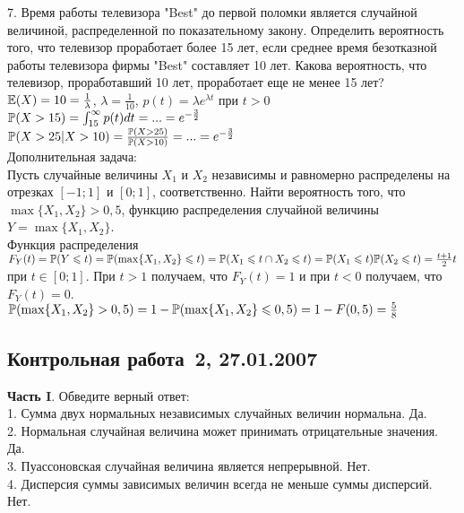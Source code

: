 \documentclass[pdftex,12pt,a4paper]{article}
\begin{document}
7.  Время работы телевизора "Best" до первой поломки является
случайной величиной, распределенной по показательному закону.
Определить вероятность того, что телевизор проработает более 15
лет, если среднее время безотказной работы телевизора фирмы "Best"
составляет 10 лет. Какова вероятность, что телевизор,
проработавший 10 лет, проработает еще не менее 15 лет? \\

$\E(X)=10=\frac{1}{\lambda}$, $\lambda=\frac{1}{10}$, $p(t)=\lambda
e^{\lambda t}$ при $t>0$ \\
$\P(X>15)=\int_{15}^{\infty}p(t)dt=...=e^{-\frac{3}{2}}$ \\
$\P(X>25|X>10)=\frac{\P(X>25)}{\P(X>10)}=...=e^{-\frac{3}{2}}$ \\

Дополнительная задача: \\
Пусть случайные величины $X_{1}$ и $X_{2}$ независимы и равномерно
распределены на отрезках $[-1;1]$ и $[0;1]$, соответственно. Найти
вероятность того, что $\max\{X_{1},X_{2}\}>0,5$, функцию
распределения случайной величины $Y=\max\{X_{1},X_{2}\}$. \\
Функция распределения $F_{Y}(t)=\P(Y\le t)=\P(\max\{X_{1},X_{2}\}\le
t)=\P(X_{1}\le t\cap X_{2}\le t)=\P(X_{1}\le t)\P(X_{2}\le
t)=\frac{t+1}{2}t$ при $t\in [0;1]$. При $t>1$ получаем, что
$F_{Y}(t)=1$ и при $t<0$ получаем, что $F_{Y}(t)=0$. \\
$\P(\max\{X_{1},X_{2}\}>0,5)=1-\P(\max\{X_{1},X_{2}\}\le
0,5)=1-F(0,5)=\frac{5}{8}$ \\




\subsection{Контрольная работа \No\,2, 27.01.2007}

 \textbf{Часть I}. Обведите верный ответ: \\

1. Сумма двух нормальных независимых случайных величин нормальна.
Да. \\

2. Нормальная случайная величина может принимать отрицательные
значения. Да. \\

3. Пуассоновская случайная величина является непрерывной. Нет.
\\

4. Дисперсия суммы зависимых величин всегда не меньше суммы
дисперсий. Нет. \\
\end{document}
